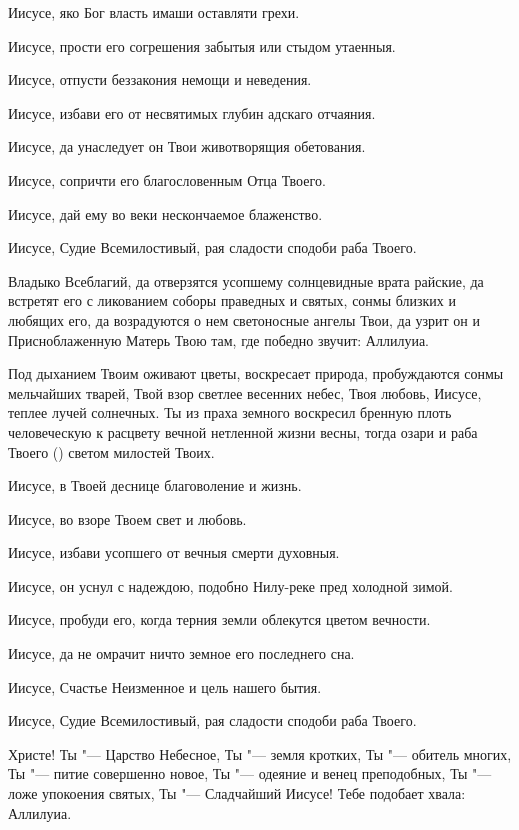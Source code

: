 \begin{mymulticols}
Иисусе, яко Бог власть имаши оставляти грехи. 

Иисусе, прости его согрешения забытыя или стыдом утаенныя. 

Иисусе, отпусти беззакония немощи и неведения. 

Иисусе, избави его от несвятимых глубин адскаго отчаяния. 

Иисусе, да унаследует он Твои животворящия обетования. 

Иисусе, сопричти его благословенным Отца Твоего. 

Иисусе, дай ему во веки нескончаемое блаженство. 

Иисусе, Судие Всемилостивый, рая сладости сподоби раба Твоего.


Владыко Всеблагий, да отверзятся усопшему солнцевидные врата райские, да встретят его с ликованием соборы праведных и святых, сонмы близких и любящих его, да возрадуются о нем светоносные ангелы Твои, да узрит он и Присноблаженную Матерь Твою там, где победно звучит: Аллилуиа.


Под дыханием Твоим оживают цветы, воскресает природа, пробуждаются сонмы мельчайших тварей, Твой взор светлее весенних небес, Твоя любовь, Иисусе, теплее лучей солнечных. Ты из праха земного воскресил бренную плоть человеческую к расцвету вечной нетленной жизни весны, тогда озари и раба Твоего () светом милостей Твоих. 

Иисусе, в Твоей деснице благоволение и жизнь. 

Иисусе, во взоре Твоем свет и любовь. 

Иисусе, избави усопшего от вечныя смерти духовныя. 

Иисусе, он уснул с надеждою, подобно Нилу-реке пред холодной зимой. 

Иисусе, пробуди его, когда терния земли облекутся цветом вечности. 

Иисусе, да не омрачит ничто земное его последнего сна. 

Иисусе, Счастье Неизменное и цель нашего бытия. 

Иисусе, Судие Всемилостивый, рая сладости сподоби раба Твоего.


Христе! Ты "--- Царство Небесное, Ты "--- земля кротких, Ты "--- обитель многих, Ты "--- питие совершенно новое, Ты "--- одеяние и венец преподобных, Ты "--- ложе упокоения святых, Ты "--- Сладчайший Иисусе! Тебе подобает хвала: Аллилуиа.


\end{mymulticols}
